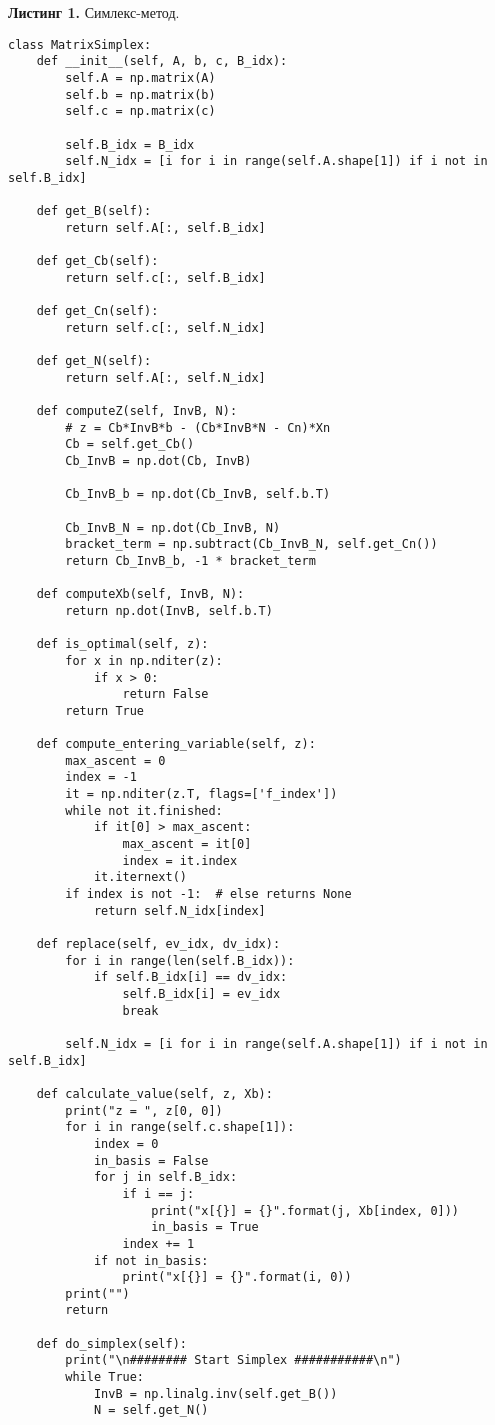 \documentclass[a4paper, 12pt]{article}   	%
\begin{document}
    \textbf{Листинг 1.} Симлекс-метод.
    \begin{verbatim}
class MatrixSimplex:
    def __init__(self, A, b, c, B_idx):
		self.A = np.matrix(A)
		self.b = np.matrix(b)
		self.c = np.matrix(c)

		self.B_idx = B_idx
		self.N_idx = [i for i in range(self.A.shape[1]) if i not in self.B_idx]

	def get_B(self):
		return self.A[:, self.B_idx]

	def get_Cb(self):
		return self.c[:, self.B_idx]

	def get_Cn(self):
		return self.c[:, self.N_idx]

	def get_N(self):
		return self.A[:, self.N_idx]

	def computeZ(self, InvB, N):
		# z = Cb*InvB*b - (Cb*InvB*N - Cn)*Xn
		Cb = self.get_Cb()
		Cb_InvB = np.dot(Cb, InvB)

		Cb_InvB_b = np.dot(Cb_InvB, self.b.T)

		Cb_InvB_N = np.dot(Cb_InvB, N)
		bracket_term = np.subtract(Cb_InvB_N, self.get_Cn())
		return Cb_InvB_b, -1 * bracket_term

	def computeXb(self, InvB, N):
		return np.dot(InvB, self.b.T)

	def is_optimal(self, z):
		for x in np.nditer(z):
			if x > 0:
				return False
		return True

	def compute_entering_variable(self, z):
		max_ascent = 0
		index = -1
		it = np.nditer(z.T, flags=['f_index'])
		while not it.finished:
			if it[0] > max_ascent:
				max_ascent = it[0]
				index = it.index
			it.iternext()
		if index is not -1:  # else returns None
			return self.N_idx[index]

	def replace(self, ev_idx, dv_idx):
		for i in range(len(self.B_idx)):
			if self.B_idx[i] == dv_idx:
				self.B_idx[i] = ev_idx
				break

		self.N_idx = [i for i in range(self.A.shape[1]) if i not in self.B_idx]

	def calculate_value(self, z, Xb):
		print("z = ", z[0, 0])
		for i in range(self.c.shape[1]):
			index = 0
			in_basis = False
			for j in self.B_idx:
				if i == j:
					print("x[{}] = {}".format(j, Xb[index, 0]))
					in_basis = True
				index += 1
			if not in_basis:
				print("x[{}] = {}".format(i, 0))
		print("")
		return

	def do_simplex(self):
		print("\n######## Start Simplex ###########\n")
		while True:
			InvB = np.linalg.inv(self.get_B())
			N = self.get_N()


\end{verbatim}
\end{document}
